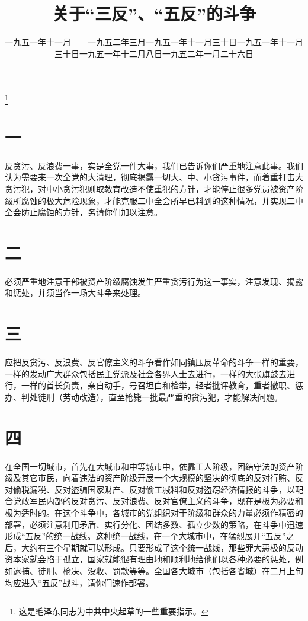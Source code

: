 
\title{关于“三反”、“五反”的斗争}
\date{一九五一年十一月——一九五二年三月}
\thanks{这是毛泽东同志为中共中央起草的一些重要指示。}
\maketitle


\date{一九五一年十一月三十日}
\section*{一}

反贪污、反浪费一事，实是全党一件大事，我们已告诉你们严重地注意此事。我们认为需要来一次全党的大清理，彻底揭露一切大、中、小贪污事件，而着重打击大贪污犯，对中小贪污犯则取教育改造不使重犯的方针，才能停止很多党员被资产阶级所腐蚀的极大危险现象，才能克服二中全会所早已料到的这种情况，并实现二中全会防止腐蚀的方针，务请你们加以注意。

\date{一九五一年十一月三十日}
\section*{二}

必须严重地注意干部被资产阶级腐蚀发生严重贪污行为这一事实，注意发现、揭露和惩处，并须当作一场大斗争来处理。

\date{一九五一年十二月八日}
\section*{三}

应把反贪污、反浪费、反官僚主义的斗争看作如同镇压反革命的斗争一样的重要，一样的发动广大群众包括民主党派及社会各界人士去进行，一样的大张旗鼓去进行，一样的首长负责，亲自动手，号召坦白和检举，轻者批评教育，重者撤职、惩办、判处徒刑（劳动改造），直至枪毙一批最严重的贪污犯，才能解决问题。

\date{一九五二年一月二十六日}
\section*{四}

在全国一切城市，首先在大城市和中等城市中，依靠工人阶级，团结守法的资产阶级及其它市民，向着违法的资产阶级开展一个大规模的坚决的彻底的反对行贿、反对偷税漏税、反对盗骗国家财产、反对偷工减料和反对盗窃经济情报的斗争，以配合党政军民内部的反对贪污、反对浪费、反对官僚主义的斗争，现在是极为必要和极为适时的。在这个斗争中，各城市的党组织对于阶级和群众的力量必须作精密的部署，必须注意利用矛盾、实行分化、团结多数、孤立少数的策略，在斗争中迅速形成“五反”的统一战线。这种统一战线，在一个大城市中，在猛烈展开“五反”之后，大约有三个星期就可以形成。只要形成了这个统一战线，那些罪大恶极的反动资本家就会陷于孤立，国家就能很有理由地和顺利地给他们以各种必要的惩处，例如逮捕、徒刑、枪决、没收、罚款等等。全国各大城市（包括各省城）在二月上旬均应进入“五反”战斗，请你们速作部署。

